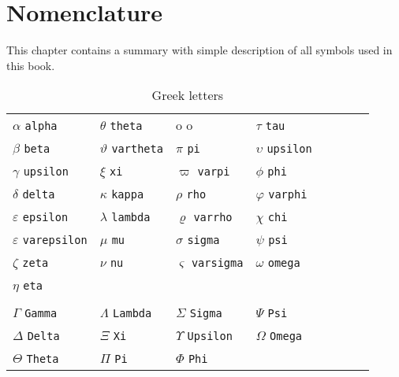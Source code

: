\documentclass[12pt,a4paper,twoside,openright]{report}
\theoremstyle{definition}
\theoremstyle{itexmp}
\numberwithin{equation}{section}
\begin{document}
\chapter{Nomenclature}

This chapter contains a summary with simple description of all symbols used in this book.

	\begin{table}[H]
	\centering
	\begin{tabular}{*8l}
	$\alpha$ \verb?alpha? &$\theta$ \verb?theta? & o o &$\tau$ \verb?tau? \\
	$\beta$ \verb?beta? &$\vartheta$ \verb?vartheta? &$\pi$ \verb?pi?         &$\upsilon$ \verb?upsilon? \\
	$\gamma$ \verb?upsilon? &$\xi$ \verb?xi?  &$\varpi$ \verb?varpi? &$\phi$ \verb?phi?  \\
	$\delta$ \verb?delta? &$\kappa$ \verb?kappa? &$\rho$ \verb?rho? &$\varphi$ \verb?varphi? \\
	$\varepsilon$ \verb?epsilon? &$\lambda$ \verb?lambda? &$\varrho$ \verb?varrho? &$\chi$ \verb?chi?  \\
	$\varepsilon$ \verb?varepsilon? &$\mu$ \verb?mu? &$\sigma$ \verb?sigma? &$\psi$ \verb?psi? \\
	$\zeta$ \verb?zeta? &$\nu$ \verb?nu? &$\varsigma$ \verb?varsigma? &$\omega$ \verb?omega? \\
	$\eta$ \verb?eta?\\
    \\
	$\Gamma$ \verb?Gamma? &$\Lambda$ \verb?Lambda? &$\Sigma$ \verb?Sigma? &$\Psi$ \verb?Psi? \\
	$\Delta$ \verb?Delta? &$\Xi$ \verb?Xi? &$\Upsilon$ \verb?Upsilon? &$\Omega$ \verb?Omega?\\
	$\Theta$ \verb?Theta? &$\Pi$ \verb?Pi? &$\Phi$ \verb?Phi?
	\end{tabular}
	\caption{Greek letters}\label{greek}
	\end{table}
\end{document}
